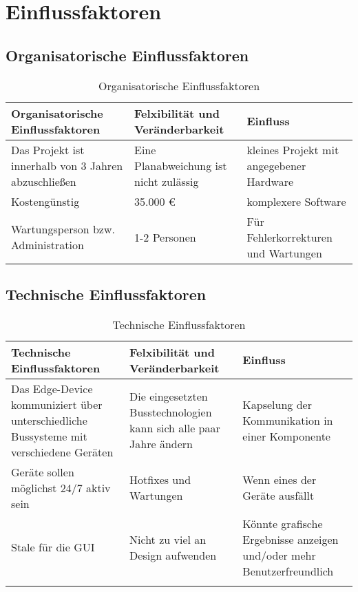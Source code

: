 \chapter{Einflussfaktoren}
\label{ch:Einflussfaktoren}

\section{Organisatorische Einflussfaktoren}
\begin{table}[h]
    \caption{Organisatorische Einflussfaktoren}
    \begin{tabular}{|p{5cm}|p{5cm}|p{5cm}|}
        \toprule
        Organisatorische Einflussfaktoren 
        & 
        Felxibilität und Veränderbarkeit 
        & 
        Einfluss \\
        \toprule
        Das Projekt ist innerhalb von 3 Jahren abzuschließen
        &
        Eine Planabweichung ist nicht zulässig
        &
        kleines Projekt mit angegebener Hardware
        \\
        \midrule
        Kostengünstig
        &
        35.000 €
        &
        komplexere Software
        \\
        \midrule
        Wartungsperson bzw. Administration
        &
        1-2 Personen
        &
        Für Fehlerkorrekturen und Wartungen \\
        \bottomrule
    \end{tabular}
    \label{tab:EinflussOrga}
\end{table}


\section{Technische Einflussfaktoren}
\begin{table}[h]
    \caption{Technische Einflussfaktoren}
    \begin{tabular}{|p{5cm}|p{5cm}|p{5cm}|}
        \toprule
        Technische Einflussfaktoren 
        & 
        Felxibilität und Veränderbarkeit 
        & 
        Einfluss \\
        \toprule
        Das Edge-Device kommuniziert über unterschiedliche Bussysteme mit verschiedene Geräten
        &
        Die eingesetzten Busstechnologien kann sich alle paar Jahre ändern
        &
        Kapselung der Kommunikation in einer Komponente
        \\
        \midrule
        Geräte sollen möglichst 24/7 aktiv sein
        &
        Hotfixes und Wartungen
        &
        Wenn eines der Geräte ausfällt
        \\
        \midrule
        Stale für die GUI
        &
        Nicht zu viel an Design aufwenden
        &
        Könnte grafische Ergebnisse anzeigen und/oder mehr Benutzerfreundlich\\
        \\
        \bottomrule
    \end{tabular}
    \label{tab:EinflussTechnisch}
\end{table}